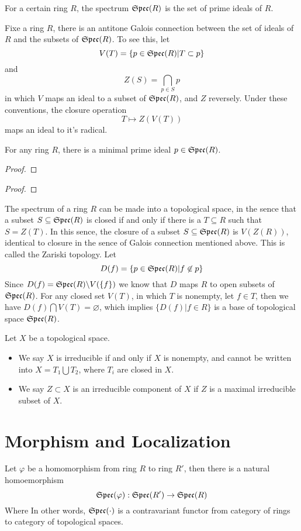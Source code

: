\begin{def}
    For a certain ring $R$, the spectrum $\mathfrak{Spec}(R)$ is the set of prime ideals of $R$.
\end{def}
\par Fixe a ring $R$, there is an antitone Galois connection between the set of ideals of $R$ and the subsets of $\mathfrak{Spec}(R)$. To see this, let
\[ V(T) = \{p\in\mathfrak{Spec}(R)|T\subset p\} \]
and
\[ Z(S) = \bigcap_{p\in S}p \]
in which $V$ maps an ideal to a subset of $\mathfrak{Spec}(R)$, and $Z$ reversely. Under these conventions, the closure operation
\[ T\mapsto Z(V(T)) \] maps an ideal to it's radical. 
\begin{lem}
    For any ring $R$, there is a minimal prime ideal $p\in\mathfrak{Spec}(R)$.
\end{lem}
\begin{proof}
\end{proof}
\begin{proof}
\end{proof}

\par The spectrum of a ring $R$ can be made into a topological space, in the sence that a subset $S\subseteq\mathfrak{Spec}(R)$ is closed if and only if there is a $T\subseteq R$ such that $S=Z(T)$. In this sence, the closure of a subset $S\subseteq\mathfrak{Spec}(R)$ is $V(Z(R))$, identical to closure in the sence of Galois connection mentioned above. This is called the Zariski topology. Let
\[ D(f) = \{p\in\mathfrak{Spec}(R)|f\not\in p\} \]
Since $D(f)=\mathfrak{Spec}(R)\backslash V(\{f\})$ we know that $D$ maps $R$ to open subsets of $\mathfrak{Spec}(R)$. For any closed set $V(T)$, in which $T$ is nonempty, let $f\in T$, then we have $D(f)\bigcap V(T)=\varnothing$, which implies $\{D(f)|f\in R\}$ is a base of topological space $\mathfrak{Spec}(R)$. 
\begin{def}
    Let $X$ be a topological space.
    \begin{itemize}
        \item We say $X$ is irreducible if and only if $X$ is nonempty, and cannot be written into $X=T_1\bigcup T_2$, where $T_i$ are closed in $X$.
        \item We say $Z\subset X$ is an irreducible component of $X$ if $Z$ is a maximal irreducible subset of $X$.
    \end{itemize}
\end{def}

\section{Morphism and Localization}
Let $\varphi$ be a homomorphism from ring $R$ to ring $R'$, then there is a natural homoemorphism
\[ \mathfrak{Spec}(\varphi):\mathfrak{Spec}(R')\rightarrow\mathfrak{Spec}(R) \]
Where In other words, $\mathfrak{Spec}(\cdot)$ is a contravariant functor from category of rings to category of topological spaces.





 
